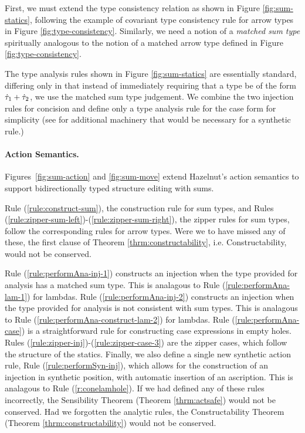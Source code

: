 First, we must extend the type consistency relation as shown in
Figure \ref{fig:sum-statics}, following the example of covariant type
consistency rule for arrow types in
Figure \ref{fig:type-consistency}. Similarly, we need a notion of
a \emph{matched sum type} spiritually analogous to the notion of a matched
arrow type defined in Figure \ref{fig:type-consistency}.

The type analysis rules shown in Figure \ref{fig:sum-statics} are
essentially standard, differing only in that instead of immediately
requiring that a type be of the form $\dot{\tau}_1 + \dot{\tau}_2$, we use the
matched sum type judgement. We combine the two injection rules for
concision and define only a type analysis rule for the case form for
simplicity (see \cite{DBLP:conf/popl/CiminiS16} for additional machinery
that would be necessary for a synthetic rule.)


\paragraph{Action Semantics.}
Figures~\ref{fig:sum-action} and \ref{fig:sum-move} extend Hazelnut's
action semantics to support bidirectionally typed structure editing with sums.
%

Rule (\ref{rule:construct-sum}), the construction rule for sum types, and
Rules (\ref{rule:zipper-sum-left})-(\ref{rule:zipper-sum-right}), the
zipper rules for sum types, follow the corresponding rules for arrow
types. Were we to have missed any of these, the first clause of
Theorem \ref{thrm:constructability}, i.e. Constructability, would not be
conserved.

Rule (\ref{rule:performAna-inj-1}) constructs an injection when the type
provided for analysis has a matched sum type. This is analagous to Rule
(\ref{rule:performAna-lam-1}) for lambdas. Rule
(\ref{rule:performAna-inj-2}) constructs an injection when the type
provided for analysis is not consistent with sum types. This is analagous
to Rule (\ref{rule:performAna-construct-lam-2}) for lambdas. Rule
(\ref{rule:performAna-case}) is a straightforward rule for constructing
case expressions in empty holes. Rules
(\ref{rule:zipper-inj})-(\ref{rule:zipper-case-3}) are the zipper cases,
which follow the structure of the statics. Finally, we also define a single
new synthetic action rule, Rule (\ref{rule:performSyn-inj}), which allows
for the construction of an injection in synthetic position, with automatic
insertion of an ascription. This is analagous to Rule
(\ref{r:conelamhole}). If we had defined any of these rules incorrectly,
the Sensibility Theorem (Theorem \ref{thrm:actsafe}) would not be
conserved. Had we forgotten the analytic rules, the Constructability
Theorem (Theorem \ref{thrm:constructability}) would not be conserved.

